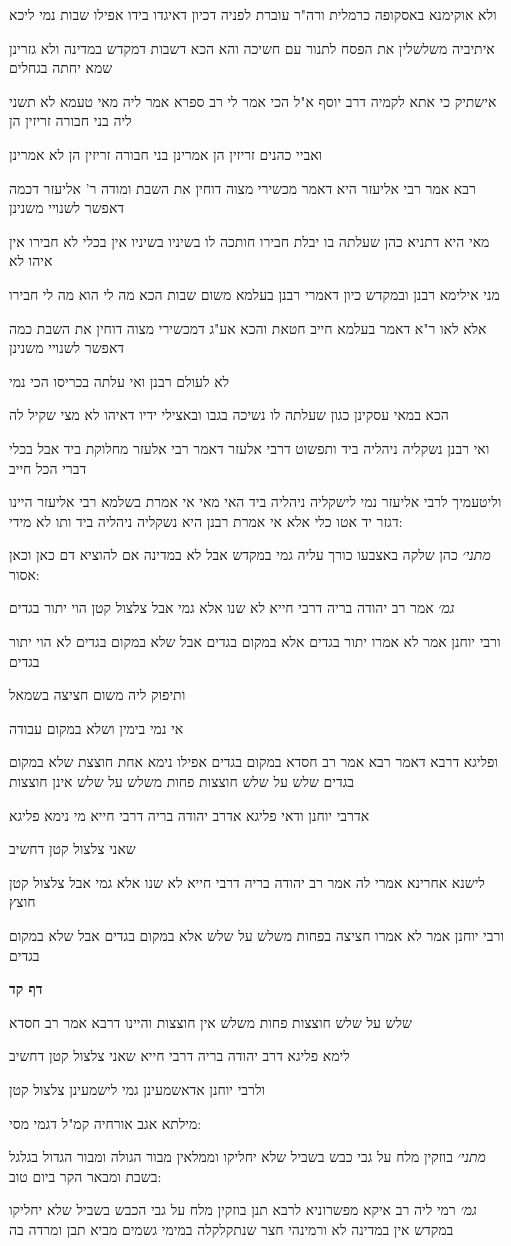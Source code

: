 \documentclass[12pt, openany]{book}
\newcommand{\sethebfont}{
\fontsize{10.5pt}{21.0pt} \selectfont
}
\newcommand{\textblock}[1]{
{\sethebfont #1\\}	
}
\newcommand{\sectname}{}
\newcommand{\newsection}[1]{
	\addcontentsline{toc}{section}{#1}
	\renewcommand{\sectname}{#1}	
	\vspace{-\baselineskip}
	\begin{center}
		\textbf{%
\fontsize{16pt}{16pt}\selectfont
			#1}
	\end{center}
	\vspace{-\baselineskip}
	\nopagebreak
}
\begin{document}
\textblock{ולא אוקימנא באסקופה כרמלית ורה"ר עוברת לפניה דכיון דאיגדו בידו אפילו שבות נמי ליכא}
\textblock{איתיביה משלשלין את הפסח לתנור עם חשיכה והא הכא דשבות דמקדש במדינה ולא גזרינן שמא יחתה בגחלים}
\textblock{אישתיק כי אתא לקמיה דרב יוסף א"ל הכי אמר לי רב ספרא אמר ליה מאי טעמא לא תשני ליה בני חבורה זריזין הן}
\textblock{ואביי כהנים זריזין הן אמרינן בני חבורה זריזין הן לא אמרינן}
\textblock{רבא אמר רבי אליעזר היא דאמר מכשירי מצוה דוחין את השבת ומודה ר' אליעזר דכמה דאפשר לשנויי משנינן}
\textblock{מאי היא דתניא כהן שעלתה בו יבלת חבירו חותכה לו בשיניו בשיניו אין בכלי לא חבירו אין איהו לא}
\textblock{מני אילימא רבנן ובמקדש כיון דאמרי רבנן בעלמא משום שבות הכא מה לי הוא מה לי חבירו}
\textblock{אלא לאו ר"א דאמר בעלמא חייב חטאת והכא אע"ג דמכשירי מצוה דוחין את השבת כמה דאפשר לשנויי משנינן}
\textblock{לא לעולם רבנן ואי עלתה בכריסו הכי נמי}
\textblock{הכא במאי עסקינן כגון שעלתה לו נשיכה בגבו ובאצילי ידיו דאיהו לא מצי שקיל לה}
\textblock{ואי רבנן נשקליה ניהליה ביד ותפשוט דרבי אלעזר דאמר רבי אלעזר מחלוקת ביד אבל בכלי דברי הכל חייב}
\textblock{וליטעמיך לרבי אליעזר נמי לישקליה ניהליה ביד האי מאי אי אמרת בשלמא רבי אליעזר היינו דגזר יד אטו כלי אלא אי אמרת רבנן היא נשקליה ניהליה ביד ותו לא מידי:}
\textblock{{\large\emph{מתני׳}} כהן שלקה באצבעו כורך עליה גמי במקדש אבל לא במדינה אם להוציא דם כאן וכאן אסור:}
\textblock{{\large\emph{גמ׳}} אמר רב יהודה בריה דרבי חייא לא שנו אלא גמי אבל צלצול קטן הוי יתור בגדים}
\textblock{ורבי יוחנן אמר לא אמרו יתור בגדים אלא במקום בגדים אבל שלא במקום בגדים לא הוי יתור בגדים}
\textblock{ותיפוק ליה משום חציצה בשמאל}
\textblock{אי נמי בימין ושלא במקום עבודה}
\textblock{ופליגא דרבא דאמר רבא אמר רב חסדא במקום בגדים אפילו נימא אחת חוצצת שלא במקום בגדים שלש על שלש חוצצות פחות משלש על שלש אינן חוצצות}
\textblock{אדרבי יוחנן ודאי פליגא אדרב יהודה בריה דרבי חייא מי נימא פליגא}
\textblock{שאני צלצול קטן דחשיב}
\textblock{לישנא אחרינא אמרי לה אמר רב יהודה בריה דרבי חייא לא שנו אלא גמי אבל צלצול קטן חוצץ}
\textblock{ורבי יוחנן אמר לא אמרו חציצה בפחות משלש על שלש אלא במקום בגדים אבל שלא במקום בגדים}
\newsection{דף קד}
\textblock{שלש על שלש חוצצות פחות משלש אין חוצצות והיינו דרבא אמר רב חסדא}
\textblock{לימא פליגא דרב יהודה בריה דרבי חייא שאני צלצול קטן דחשיב}
\textblock{ולרבי יוחנן אדאשמעינן גמי לישמעינן צלצול קטן}
\textblock{מילתא אגב אורחיה קמ"ל דגמי מסי:}
\textblock{{\large\emph{מתני׳}} בוזקין מלח על גבי כבש בשביל שלא יחליקו וממלאין מבור הגולה ומבור הגדול בגלגל בשבת ומבאר הקר ביום טוב:}
\textblock{{\large\emph{גמ׳}} רמי ליה רב איקא מפשרוניא לרבא תנן בוזקין מלח על גבי הכבש בשביל שלא יחליקו במקדש אין במדינה לא ורמינהי חצר שנתקלקלה במימי גשמים מביא תבן ומרדה בה}
\end{document}
